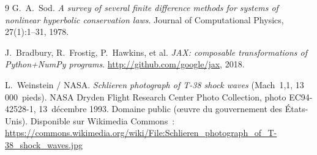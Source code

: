 \documentclass[12pt,a4paper,oneside]{report}
\begin{document}
\begin{thebibliography}{9}
G.~A.~Sod.
\emph{A survey of several finite difference methods for systems of nonlinear
hyperbolic conservation laws}.
Journal of Computational Physics, 27(1):1--31, 1978.

J.~Bradbury, R.~Frostig, P.~Hawkins, et al.
\emph{JAX: composable transformations of Python+NumPy programs}.
\url{http://github.com/google/jax}, 2018.

L.~Weinstein / NASA.
\emph{Schlieren photograph of T-38 shock waves} (Mach~1,1, 13\,000~pieds).
NASA Dryden Flight Research Center Photo Collection, photo EC94-42528-1,
13~décembre 1993. Domaine public (œuvre du gouvernement des États-Unis).
Disponible sur Wikimedia Commons~:
\url{https://commons.wikimedia.org/wiki/File:Schlieren_photograph_of_T-38_shock_waves.jpg}

\end{thebibliography}
\end{document}
